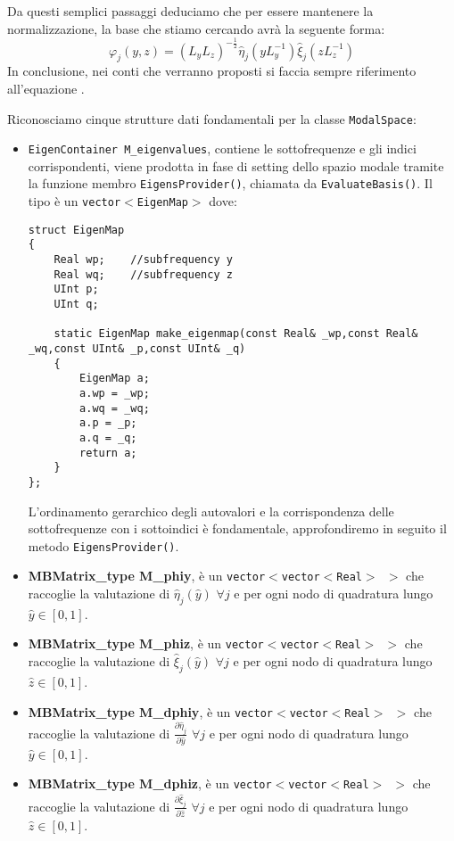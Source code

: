 Da questi semplici passaggi deduciamo che per essere mantenere la normalizzazione, la base che stiamo cercando avr\`a la seguente forma:
\begin{equation}
\label{eq: base sul dominio corrente}
\varphi_j(y,z) = (L_yL_z)^{-\frac{1}{2}}\hat{\eta}_j(yL_y^{-1})\hat{\xi}_j(zL_z^{-1})
\end{equation}
In conclusione, nei conti che verranno proposti si faccia sempre riferimento all'equazione .

Riconosciamo cinque strutture dati fondamentali per la classe \texttt{ModalSpace}:

\begin{itemize}

\item \texttt{EigenContainer M\_eigenvalues}, contiene le sottofrequenze e gli indici corrispondenti, viene prodotta in fase di setting dello 
spazio modale tramite la funzione membro \texttt{EigensProvider()}, chiamata da \texttt{EvaluateBasis()}. Il tipo \`e un \texttt{vector$<
$EigenMap$>$} dove:
 
\begin{lstlisting}[style = general]
struct EigenMap
{
	Real wp;	//subfrequency y
	Real wq;	//subfrequency z
	UInt p;
	UInt q;
	
	static EigenMap make_eigenmap(const Real& _wp,const Real& _wq,const UInt& _p,const UInt& _q)
	{
		EigenMap a;
		a.wp = _wp;
		a.wq = _wq;
		a.p = _p;
		a.q = _q;
		return a;	
	}
};
\end{lstlisting}
L'ordinamento gerarchico degli autovalori e la corrispondenza delle sottofrequenze con i sottoindici \`e fondamentale, approfondiremo in seguito 
il metodo \texttt{EigensProvider()}.

\item \textbf{MBMatrix\_type M\_phiy}, \`e un \texttt{vector$<$vector$<$Real$>$ $>$} che raccoglie la valutazione di $\hat{\eta}_j(\hat{y})$ $\forall j$ e per ogni nodo di quadratura lungo $\hat{y}\in[0,1]$.

\item \textbf{MBMatrix\_type M\_phiz}, \`e un \texttt{vector$<$vector$<$Real$>$ $>$} che raccoglie la valutazione di $\hat{\xi}_j(\hat{y})$ $\forall j$ e per ogni nodo di quadratura lungo $\hat{z}\in[0,1]$.

\item \textbf{MBMatrix\_type M\_dphiy}, \`e un \texttt{vector$<$vector$<$Real$>$ $>$} che raccoglie la valutazione di $\frac{\partial\hat{\eta}_j}{\partial 	\hat{y}}$ $\forall j$ e per ogni nodo di quadratura lungo $\hat{y}\in[0,1]$.

\item \textbf{MBMatrix\_type M\_dphiz}, \`e un \texttt{vector$<$vector$<$Real$>$ $>$} che raccoglie la valutazione di $\frac{\partial\hat{\xi}_j}{\partial 	\hat{z}}$ $\forall j$ e per ogni nodo di quadratura lungo $\hat{z}\in[0,1]$.

\end{itemize}


